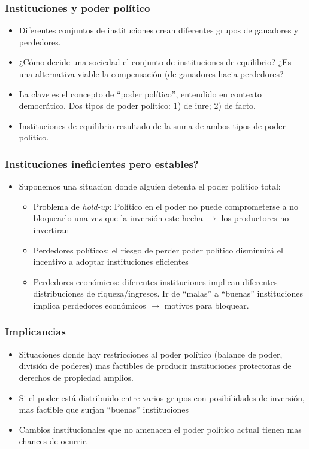 \documentclass[handout,final,xcolor=dvipsnames]{beamer}
\begin{document}
\begin{frame}\frametitle{Instituciones y poder político}
\begin{itemize}\itemsep 15pt
\item Diferentes conjuntos de instituciones crean diferentes grupos de
  ganadores y perdedores. 
\item ¿Cómo decide una sociedad el conjunto de instituciones de
  equilibrio? ¿Es una alternativa viable la compensación (de ganadores
  hacia perdedores?
\item La clave es el concepto de ``poder político'', entendido en
  contexto democrático. Dos tipos de poder político: 1) de iure; 2) de
  facto. 
\item Instituciones de equilibrio resultado de la suma de ambos tipos
  de poder político. 
\end{itemize}
\end{frame}

\begin{frame}\frametitle{Instituciones ineficientes pero estables?}
\begin{itemize}\itemsep 15pt
\item Suponemos una situacion donde alguien detenta el poder político
  total:
\begin{itemize}\itemsep 15pt \medskip 
\item Problema de \textit{hold-up}: Político en el poder no puede comprometerse a no bloquearlo una
  vez que la inversión este hecha $\longrightarrow$ los productores no
  invertiran
\item Perdedores políticos: el riesgo de perder poder político
  disminuirá el incentivo a adoptar instituciones eficientes
\item Perdedores económicos: diferentes instituciones implican
  diferentes distribuciones de riqueza/ingresos. Ir de ``malas'' a
  ``buenas'' instituciones implica perdedores económicos
  $\longrightarrow$ motivos para bloquear.  
\end{itemize}
\end{itemize}
\end{frame}


\begin{frame}\frametitle{Implicancias}
\begin{itemize}\itemsep 15pt
\item Situaciones donde hay restricciones al poder político (balance
  de poder, división de poderes) mas factibles de producir
  instituciones protectoras de derechos de propiedad amplios. 
\item Si el poder está distribuido entre varios grupos con
  posibilidades de inversión, mas factible que surjan ``buenas''
  instituciones
\item Cambios institucionales que no amenacen el poder político actual
  tienen mas chances de ocurrir. 
\end{itemize}
\end{frame}
\end{document}
